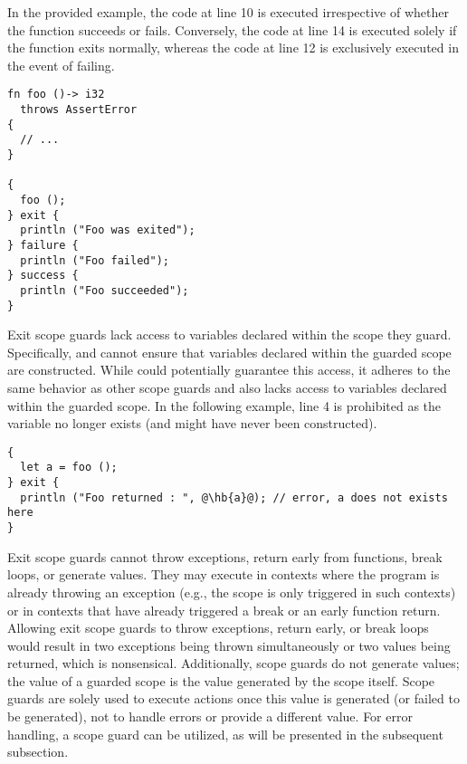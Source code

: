 \smallskip

In the provided example, the code at line 10 is executed irrespective of whether
the  function succeeds or fails. Conversely, the code at line 14 is
executed solely if the  function exits normally, whereas the code at
line 12 is exclusively executed in the event of  failing.

\begin{lstlisting}[style=coloredverbatim]
fn foo ()-> i32
  throws AssertError
{
  // ...
}

{
  foo ();
} exit {
  println ("Foo was exited");
} failure {
  println ("Foo failed");
} success {
  println ("Foo succeeded");
}
\end{lstlisting}

Exit scope guards lack access to variables declared within the scope they guard.
Specifically,  and  cannot ensure that variables
declared within the guarded scope are constructed. While  could
potentially guarantee this access, it adheres to the same behavior as other
scope guards and also lacks access to variables declared within the guarded
scope. In the following example, line 4 is prohibited as the variable 
no longer exists (and might have never been constructed).

\begin{lstlisting}[style=coloredverbatim, escapechar=@]
{
  let a = foo ();
} exit {
  println ("Foo returned : ", @\hb{a}@); // error, a does not exists here
}
\end{lstlisting}

Exit scope guards cannot throw exceptions, return early from functions, break
loops, or generate values. They may execute in contexts where the program is
already throwing an exception (e.g., the  scope is only triggered
in such contexts) or in contexts that have already triggered a break or an early
function return. Allowing exit scope guards to throw exceptions, return early,
or break loops would result in two exceptions being thrown simultaneously or two
values being returned, which is nonsensical. Additionally, scope guards do not
generate values; the value of a guarded scope is the value generated by the
scope itself. Scope guards are solely used to execute actions once this value is
generated (or failed to be generated), not to handle errors or provide a
different value. For error handling, a  scope guard can be
utilized, as will be presented in the subsequent subsection.

